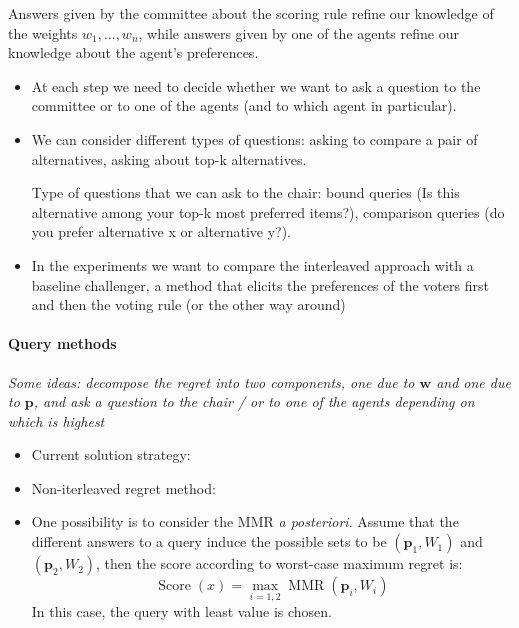 \documentclass[12pt]{article}
\newcommand{\pprofile}{\textbf{p}}%
\newcommand{\w}{\textbf{w}}%
\DeclareMathOperator{\SCORE}{Score}
\DeclareMathOperator{\MMR}{MMR}
\begin{document}
Answers given by the committee about the scoring rule refine our knowledge of the weights $w_1,\ldots,w_n$, while
answers given by one of the agents refine our knowledge about the agent's preferences.


\begin{itemize}
\item At each step we need to decide whether we want to ask a question to the committee or to one of the agents (and to which agent in particular). 


\item We can consider different types of questions: asking to compare a pair of alternatives, asking about top-k alternatives.

Type of questions that we can ask to the chair:
bound queries (Is this alternative among your top-k most preferred items?), comparison queries (do you prefer alternative x or alternative y?).

\item In the experiments we want to compare the interleaved approach with a baseline challenger, a method  that elicits the preferences of the voters first and then the voting rule (or the other way around)
\end{itemize}



\paragraph{Query methods}

{\em Some ideas: decompose the regret into two components, one due to $\w$ and one due to $\pprofile$, and ask a question to the chair / or to one of the agents depending on which is highest}


\begin{itemize}
\item Current solution strategy:

\item Non-iterleaved regret method:

 \item One possibility is to consider the MMR {\em a posteriori}.
Assume that the different answers to a query induce the possible sets to be $(\pprofile_1,W_1)$ and $(\pprofile_2,W_2)$, then the score according to worst-case maximum regret is:
\[\SCORE(x)= \max_{i=1,2} \MMR(\pprofile_i,W_i) \]
In this case, the query with least value is chosen.
\end{itemize}
\end{document}
